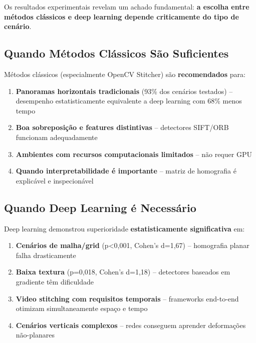 Os resultados experimentais revelam um achado fundamental: \textbf{a escolha entre métodos clássicos e deep learning depende criticamente do tipo de cenário}.

\subsection{Quando Métodos Clássicos São Suficientes}

Métodos clássicos (especialmente OpenCV Stitcher) são \textbf{recomendados} para:

\begin{enumerate}
    \item \textbf{Panoramas horizontais tradicionais} (93\% dos cenários testados) -- desempenho estatisticamente equivalente a deep learning com 68\% menos tempo

    \item \textbf{Boa sobreposição e features distintivas} -- detectores SIFT/ORB funcionam adequadamente

    \item \textbf{Ambientes com recursos computacionais limitados} -- não requer GPU

    \item \textbf{Quando interpretabilidade é importante} -- matriz de homografia é explicável e inspecionável
\end{enumerate}

\subsection{Quando Deep Learning é Necessário}

Deep learning demonstrou superioridade \textbf{estatisticamente significativa} em:

\begin{enumerate}
    \item \textbf{Cenários de malha/grid} (p<0,001, Cohen's d=1,67) -- homografia planar falha drasticamente

    \item \textbf{Baixa textura} (p=0,018, Cohen's d=1,18) -- detectores baseados em gradiente têm dificuldade

    \item \textbf{Video stitching com requisitos temporais} -- frameworks end-to-end otimizam simultaneamente espaço e tempo

    \item \textbf{Cenários verticais complexos} -- redes conseguem aprender deformações não-planares
\end{enumerate}

